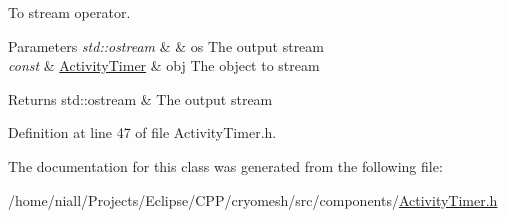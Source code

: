 \-To stream operator. 


\begin{DoxyParams}{\-Parameters}
{\em std\-::ostream} & \& os \-The output stream \\
\hline
{\em const} & \hyperlink{classcryomesh_1_1components_1_1ActivityTimer}{\-Activity\-Timer} \& obj \-The object to stream\\
\hline
\end{DoxyParams}
\begin{DoxyReturn}{\-Returns}
std\-::ostream \& \-The output stream 
\end{DoxyReturn}


\-Definition at line 47 of file \-Activity\-Timer.\-h.



\-The documentation for this class was generated from the following file\-:\begin{DoxyCompactItemize}
\item 
/home/niall/\-Projects/\-Eclipse/\-C\-P\-P/cryomesh/src/components/\hyperlink{ActivityTimer_8h}{\-Activity\-Timer.\-h}\end{DoxyCompactItemize}
